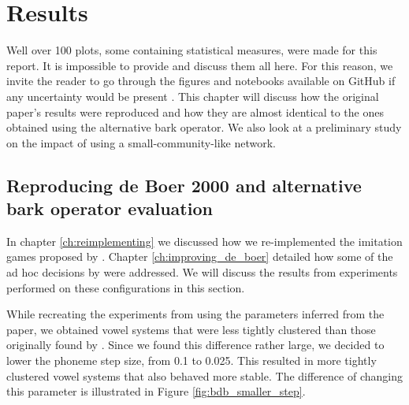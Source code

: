 \chapter{Results}
\label{ch:results}

Well over 100 plots, some containing statistical measures, were made for this report.
It is impossible to provide and discuss them all here.
For this reason, we invite the reader to go through the figures and notebooks available on GitHub if any uncertainty would be present \citep{github_project}.
This chapter will discuss how the original paper's results were reproduced and how they are almost identical to the ones obtained using the alternative bark operator.
We also look at a preliminary study on the impact of using a small-community-like network.



\section{Reproducing de Boer 2000 and alternative bark operator evaluation}
\label{sec:results_de_boer_bark}

In chapter \ref{ch:reimplementing} we discussed how we re-implemented the imitation games proposed by \citet{deBoer2000}.
Chapter \ref{ch:improving_de_boer} detailed how some of the ad hoc decisions by \citet{deBoer2000} were addressed.
We will discuss the results from experiments performed on these configurations in this section.

While recreating the experiments from \citet{deBoer2000} using the parameters inferred from the paper, we obtained vowel systems that were less tightly clustered than those originally found by \citet{deBoer2000}.
Since we found this difference rather large, we decided to lower the phoneme step size, from 0.1 to 0.025.
This resulted in more tightly clustered vowel systems that also behaved more stable.
The difference of changing this parameter is illustrated in Figure \ref{fig:bdb_smaller_step}.

